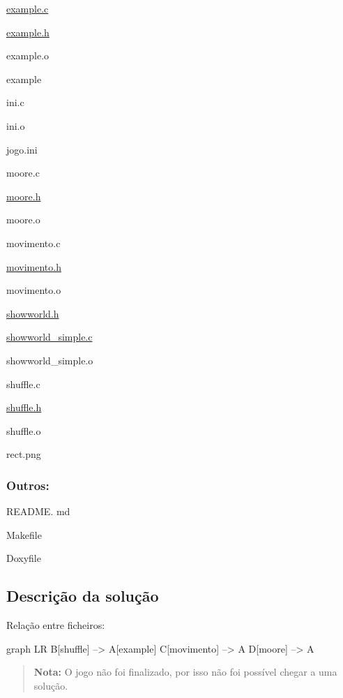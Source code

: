 \begin{DoxyItemize}
\item \mbox{\hyperlink{example_8c}{example.\+c}}
\item \mbox{\hyperlink{example_8h_source}{example.\+h}}
\item example.\+o
\item example
\item ini.\+c
\item ini.\+o
\item jogo.\+ini
\item moore.\+c
\item \mbox{\hyperlink{moore_8h_source}{moore.\+h}}
\item moore.\+o
\item movimento.\+c
\item \mbox{\hyperlink{movimento_8h_source}{movimento.\+h}}
\item movimento.\+o
\item \mbox{\hyperlink{showworld_8h}{showworld.\+h}}
\item \mbox{\hyperlink{showworld__simple_8c}{showworld\+\_\+simple.\+c}}
\item showworld\+\_\+simple.\+o
\item shuffle.\+c
\item \mbox{\hyperlink{shuffle_8h_source}{shuffle.\+h}}
\item shuffle.\+o
\item rect.\+png
\end{DoxyItemize}

\subsubsection*{Outros\+:}


\begin{DoxyItemize}
\item R\+E\+A\+D\+ME. md
\item Makefile
\item Doxyfile
\end{DoxyItemize}

\subsection*{Descrição da solução}

Relação entre ficheiros\+:


\begin{DoxyCode}
graph LR
B[shuffle] --> A[example]
C[movimento] --> A
D[moore] --> A
\end{DoxyCode}
 \begin{quote}
{\bfseries Nota\+:} O jogo não foi finalizado, por isso não foi possível chegar a uma solução. \end{quote}



